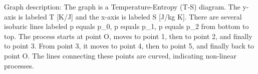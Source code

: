 Graph description:
The graph is a Temperature-Entropy (T-S) diagram. The y-axis is labeled T [K/J] and the x-axis is labeled S [J/kg K]. There are several isobaric lines labeled p equals p_0, p equals p_1, p equals p_2 from bottom to top. The process starts at point O, moves to point 1, then to point 2, and finally to point 3. From point 3, it moves to point 4, then to point 5, and finally back to point O. The lines connecting these points are curved, indicating non-linear processes.